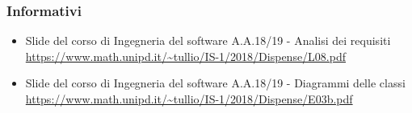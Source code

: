 	\subsubsection{Informativi}
	\begin{itemize}
		\item Slide del corso di Ingegneria del software A.A.18/19 - Analisi dei requisiti \\
		\url {https://www.math.unipd.it/~tullio/IS-1/2018/Dispense/L08.pdf}
		\item Slide del corso di Ingegneria del software A.A.18/19 - Diagrammi delle classi \\
		\url {https://www.math.unipd.it/~tullio/IS-1/2018/Dispense/E03b.pdf}
	\end{itemize}
		